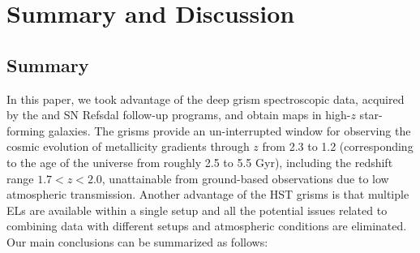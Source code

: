 \section{Summary and Discussion}\label{sect:conclu}

\subsection{Summary}

In this paper, we took advantage of the deep \hst grism spectroscopic data, acquired by the
\glass and SN Refsdal follow-up programs, and obtain \gpm maps in high-$z$ star-forming
galaxies. The \hst grisms provide an un-interrupted window for observing the cosmic evolution
of metallicity gradients through $z$ from 2.3 to 1.2 (corresponding to the age of the
universe from roughly 2.5 to 5.5 Gyr), including the redshift range $1.7<z<2.0$, unattainable
from ground-based observations due to low atmospheric transmission. Another advantage of the
HST grisms is that multiple ELs are available within a single setup and all the potential
issues related to combining data with different setups and atmospheric conditions are
eliminated. Our main conclusions can be summarized as follows:
